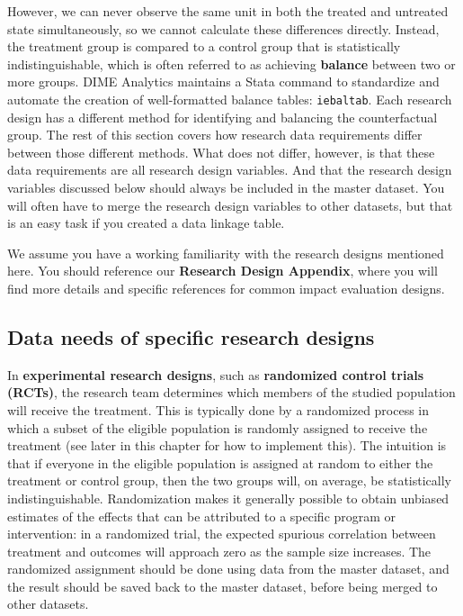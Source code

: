 However, we can never observe the same unit
in both the treated and untreated state simultaneously,
so we cannot calculate these differences directly.
Instead, the treatment group is compared to a control group
that is statistically indistinguishable,
which is often referred to as achieving
\textbf{balance} between two or more groups.
DIME Analytics maintains a Stata command to
standardize and automate the creation of well-formatted balance tables:
\texttt{iebaltab}.
Each research design has a different method for
identifying and balancing the counterfactual group.
The rest of this section covers how research data requirements
differ between those different methods.
What does not differ, however,
is that these data requirements are all research design variables.
And that the research design variables discussed below
should always be included in the master dataset.
You will often have to merge
the research design variables to other datasets,
but that is an easy task
if you created a data linkage table.

We assume you have a working familiarity
with the research designs mentioned here.
You should reference our \textbf{Research Design Appendix},
where you will find more details
and specific references for common impact evaluation designs.

\subsection{Data needs of specific research designs}


In \textbf{experimental research designs},
such as \textbf{randomized control trials (RCTs)},
the research team determines which members
of the studied population will receive the treatment.
This is typically done by a randomized process
in which a subset of the eligible population
is randomly assigned to receive the treatment
(see later in this chapter for how to implement this).
The intuition is that if everyone in the eligible population
is assigned at random to either the treatment or control group,
then the two groups will, on average, be statistically indistinguishable.
Randomization makes it generally possible to obtain unbiased estimates of 
the effects that can be attributed to a specific program or intervention:
in a randomized trial, the expected spurious correlation between treatment and outcomes 
will approach zero as the sample size increases.
The randomized assignment should be done
using data from the master dataset,
and the result should be saved back to the master dataset,
before being merged to other datasets.

